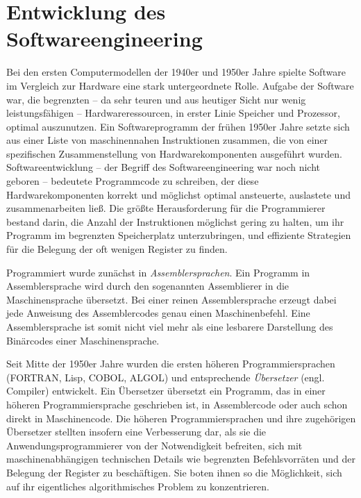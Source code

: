 \section{Entwicklung des Softwareengineering}
\label{sec:Kap-1.1}

Bei den ersten Computermodellen der 1940er und 1950er Jahre spielte Software im Vergleich zur Hardware eine stark untergeordnete Rolle. Aufgabe der Software war, die begrenzten – da sehr teuren und aus heutiger Sicht nur wenig leistungsfähigen – Hardwareressourcen, in erster Linie Speicher und Prozessor, optimal auszunutzen. Ein Softwareprogramm der frühen 1950er Jahre setzte sich aus einer Liste von maschinennahen Instruktionen zusammen, die von einer spezifischen Zusammenstellung von Hardwarekomponenten ausgeführt wurden. Softwareentwicklung – der Begriff des Softwareengineering war noch nicht geboren – bedeutete Programmcode zu schreiben, der diese Hardwarekomponenten korrekt und möglichst optimal ansteuerte, auslastete und zusammenarbeiten ließ. Die größte Herausforderung für die Programmierer bestand darin, die Anzahl der Instruktionen möglichst gering zu halten, um ihr Programm im begrenzten Speicherplatz unterzubringen, und effiziente Strategien für die Belegung der oft wenigen Register zu finden.

Programmiert wurde zunächst in \textit{Assemblersprachen}. 
Ein Programm in Assemblersprache wird durch den sogenannten Assemblierer in die Maschinensprache übersetzt. Bei einer reinen Assemblersprache erzeugt dabei jede Anweisung des Assemblercodes genau einen Maschinenbefehl. Eine Assemblersprache ist somit nicht viel mehr als eine lesbarere Darstellung des Binärcodes einer Maschinensprache.  

Seit Mitte der 1950er Jahre wurden die ersten höheren Programmiersprachen\linebreak %
(FORTRAN, Lisp, COBOL, ALGOL) und entsprechende \textit{Übersetzer} 
(engl. Compiler) entwickelt. Ein Übersetzer übersetzt ein Programm, das in einer höheren Programmiersprache geschrieben ist, in Assemblercode oder auch schon direkt in Maschinencode. Die höheren Programmiersprachen und ihre zugehörigen Übersetzer stellten insofern eine Verbesserung dar, als sie die Anwendungsprogrammierer von der Notwendigkeit befreiten, sich mit maschinenabhängigen technischen Details wie begrenzten Befehlsvorräten und der Belegung der Register zu beschäftigen. Sie boten ihnen so die Möglichkeit, sich auf ihr eigentliches algorithmisches Problem zu konzentrieren. 

